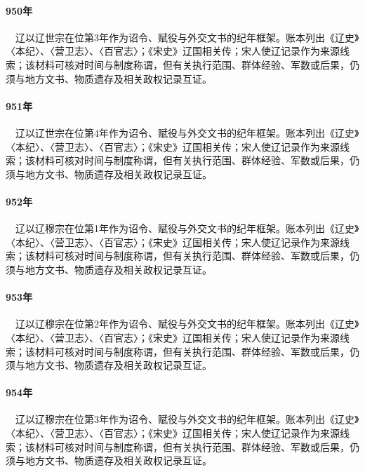\paragraph{950年}　辽以辽世宗在位第3年作为诏令、赋役与外交文书的纪年框架。账本列出《辽史》〈本纪〉、〈营卫志〉、〈百官志〉；《宋史》辽国相关传；宋人使辽记录作为来源线索；该材料可核对时间与制度称谓，但有关执行范围、群体经验、军数或后果，仍须与地方文书、物质遗存及相关政权记录互证。

\paragraph{951年}　辽以辽世宗在位第4年作为诏令、赋役与外交文书的纪年框架。账本列出《辽史》〈本纪〉、〈营卫志〉、〈百官志〉；《宋史》辽国相关传；宋人使辽记录作为来源线索；该材料可核对时间与制度称谓，但有关执行范围、群体经验、军数或后果，仍须与地方文书、物质遗存及相关政权记录互证。

\paragraph{952年}　辽以辽穆宗在位第1年作为诏令、赋役与外交文书的纪年框架。账本列出《辽史》〈本纪〉、〈营卫志〉、〈百官志〉；《宋史》辽国相关传；宋人使辽记录作为来源线索；该材料可核对时间与制度称谓，但有关执行范围、群体经验、军数或后果，仍须与地方文书、物质遗存及相关政权记录互证。

\paragraph{953年}　辽以辽穆宗在位第2年作为诏令、赋役与外交文书的纪年框架。账本列出《辽史》〈本纪〉、〈营卫志〉、〈百官志〉；《宋史》辽国相关传；宋人使辽记录作为来源线索；该材料可核对时间与制度称谓，但有关执行范围、群体经验、军数或后果，仍须与地方文书、物质遗存及相关政权记录互证。

\paragraph{954年}　辽以辽穆宗在位第3年作为诏令、赋役与外交文书的纪年框架。账本列出《辽史》〈本纪〉、〈营卫志〉、〈百官志〉；《宋史》辽国相关传；宋人使辽记录作为来源线索；该材料可核对时间与制度称谓，但有关执行范围、群体经验、军数或后果，仍须与地方文书、物质遗存及相关政权记录互证。

